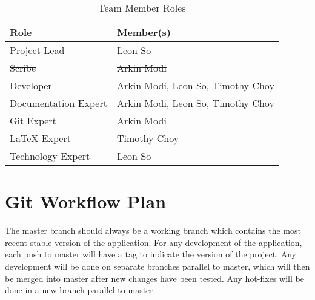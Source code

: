 \documentclass[12pt, titlepage]{article}
\begin{document}
\begin{table}[H]
    \centering
    \caption{Team Member Roles}
    \vspace{5pt}
    \begin{tabular}{|l|l|}
        \hline
        \textbf{Role} & \textbf{Member(s)} \\
        \hline
        Project Lead & Leon So\\
        \hline
        \sout{Scribe} & \sout{Arkin Modi}\\
        \hline
        Developer & Arkin Modi, Leon So, Timothy Choy \\
        \hline
        Documentation Expert & Arkin Modi, Leon So, Timothy Choy \\
        \hline
        Git Expert & Arkin Modi \\
        \hline
        LaTeX Expert & Timothy Choy \\
        \hline
        Technology Expert & Leon So \\
        \hline
    \end{tabular}
\end{table}

\section{Git Workflow Plan}
The master branch should always be a working branch which contains the most recent stable version of the application. For any development of the application, each push to master will have a tag to indicate the version of the project. Any development will be done on separate branches parallel to master, which will then be merged into master after new changes have been tested. Any hot-fixes will be done in a new branch parallel to master.
\end{document}
